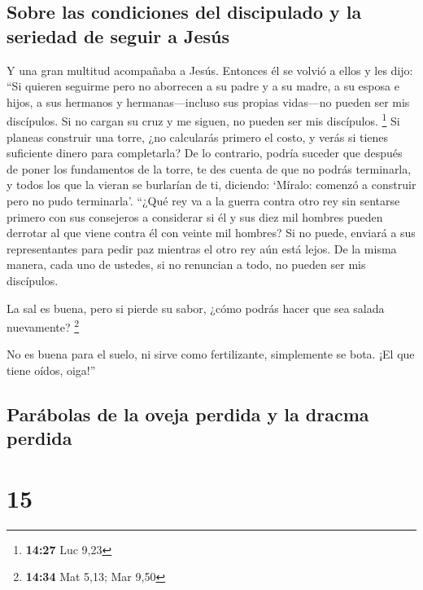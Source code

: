 \hypertarget{sobre-las-condiciones-del-discipulado-y-la-seriedad-de-seguir-a-jesuxfas}{%
\subsection{Sobre las condiciones del discipulado y la seriedad de
seguir a
Jesús}\label{sobre-las-condiciones-del-discipulado-y-la-seriedad-de-seguir-a-jesuxfas}}

 Y una gran multitud acompañaba a Jesús. Entonces él se
volvió a ellos y les dijo:  ``Si quieren seguirme pero no
aborrecen a su padre y a su madre, a su esposa e hijos, a sus hermanos y
hermanas---incluso sus propias vidas---no pueden ser mis discípulos.
 Si no cargan su cruz y me siguen, no pueden ser mis
discípulos. \footnote{\textbf{14:27} Luc 9,23}  Si
planeas construir una torre, ¿no calcularás primero el costo, y verás si
tienes suficiente dinero para completarla?  De lo
contrario, podría suceder que después de poner los fundamentos de la
torre, te des cuenta de que no podrás terminarla, y todos los que la
vieran se burlarían de ti, diciendo:  `Míralo: comenzó a
construir pero no pudo terminarla'.  ``¿Qué rey va a la
guerra contra otro rey sin sentarse primero con sus consejeros a
considerar si él y sus diez mil hombres pueden derrotar al que viene
contra él con veinte mil hombres?  Si no puede, enviará a
sus representantes para pedir paz mientras el otro rey aún está lejos.
 De la misma manera, cada uno de ustedes, si no renuncian
a todo, no pueden ser mis discípulos.

 La sal es buena, pero si pierde su sabor, ¿cómo podrás
hacer que sea salada nuevamente? \footnote{\textbf{14:34} Mat 5,13; Mar
  9,50}

 No es buena para el suelo, ni sirve como fertilizante,
simplemente se bota. ¡El que tiene oídos, oiga!''

\hypertarget{paruxe1bolas-de-la-oveja-perdida-y-la-dracma-perdida}{%
\subsection{Parábolas de la oveja perdida y la dracma
perdida}\label{paruxe1bolas-de-la-oveja-perdida-y-la-dracma-perdida}}

\hypertarget{section-14}{%
\section{15}\label{section-14}}

